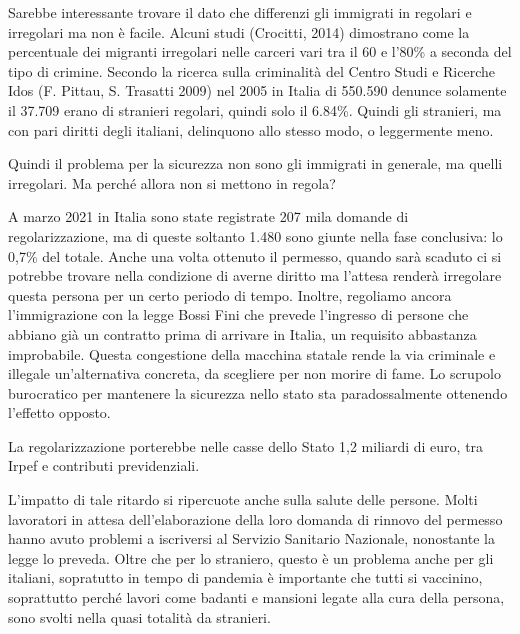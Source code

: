 \documentclass[12pt]{book} %
\begin{document}
Sarebbe interessante trovare il dato che differenzi gli immigrati in regolari e irregolari ma non è facile. Alcuni studi
(Crocitti,
2014) dimostrano come la percentuale dei migranti irregolari nelle carceri vari tra il 60 e l'80\% a
seconda del tipo di crimine. Secondo la ricerca sulla criminalità del Centro Studi e Ricerche Idos (F. Pittau, S.
Trasatti 2009) nel 2005 in Italia di 550.590 denunce solamente il 37.709 erano di stranieri regolari, quindi solo il
6.84\%. Quindi gli stranieri, ma con pari diritti degli italiani, delinquono allo stesso modo, o leggermente meno.


\bigskip

Quindi il problema per la sicurezza non sono gli immigrati in generale, ma quelli irregolari. Ma perché allora non si
mettono in regola? 

A marzo 2021 in Italia sono state registrate 207 mila domande di regolarizzazione, ma di queste soltanto 1.480 sono
giunte nella fase conclusiva: lo 0,7\% del totale. Anche una volta ottenuto il permesso, quando sarà scaduto ci si
potrebbe trovare nella condizione di averne diritto ma l'attesa renderà irregolare questa persona
per un certo periodo di tempo. Inoltre, regoliamo ancora l'immigrazione con la legge Bossi Fini
che prevede l'ingresso di persone che abbiano già un contratto prima di arrivare in Italia, un
requisito abbastanza improbabile. Questa congestione della macchina statale rende la via criminale e illegale
un'alternativa concreta, da scegliere per non morire di fame. Lo scrupolo burocratico per
mantenere la sicurezza nello stato sta paradossalmente ottenendo l'effetto opposto.


\bigskip

La regolarizzazione porterebbe nelle casse dello Stato 1,2 miliardi di euro, tra Irpef e contributi previdenziali. 

L'impatto di tale ritardo si ripercuote anche sulla salute delle persone. Molti lavoratori in
attesa dell'elaborazione della loro domanda di rinnovo del permesso hanno avuto problemi a
iscriversi al Servizio Sanitario Nazionale, nonostante la legge lo preveda. Oltre che per lo straniero, questo è un
problema anche per gli italiani, sopratutto in tempo di pandemia è importante che tutti si vaccinino, soprattutto
perché lavori come badanti e mansioni legate alla cura della persona, sono svolti nella quasi totalità da stranieri.
\end{document}
